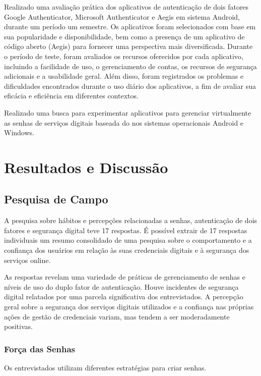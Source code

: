 \documentclass[12pt]{article}
\begin{document}
Realizado uma avaliação prática dos aplicativos de autenticação de dois
fatores Google Authenticator, Microsoft Authenticator e Aegis em sistema
Android, durante um período um semestre. Os aplicativos foram selecionados
com base em sua popularidade e disponibilidade, bem como a presença de um
aplicativo de código aberto (Aegis) para fornecer uma perspectiva mais
diversificada.
Durante o período de teste, foram avaliados os recursos oferecidos por cada
aplicativo, incluindo a facilidade de uso, o gerenciamento de contas, os
recursos de segurança adicionais e a usabilidade geral.
Além disso, foram registrados os problemas e dificuldades encontrados
durante o uso diário dos aplicativos, a fim de avaliar sua eficácia e
eficiência em diferentes contextos.

Realizado uma busca para experimentar aplicativos para gerenciar
virtualmente as senhas de serviços digitais baseada do nos sistemas
operacionais Android e Windows.

\section{Resultados e Discussão}

\subsection{Pesquisa de Campo}

A pesquisa sobre hábitos e percepções relacionadas a senhas, autenticação de dois
fatores e segurança digital teve 17 respostas.
É possível extrair de 17 respostas individuais um resumo consolidado de uma pesquisa
sobre o comportamento e a confiança dos usuários em relação às suas credenciais
digitais e à segurança dos serviços online.

As respostas revelam uma variedade de práticas de gerenciamento de senhas e níveis
de uso do duplo fator de autenticação.
Houve incidentes de segurança digital relatados por uma parcela significativa dos
entrevistados.
A percepção geral sobre a segurança dos serviços digitais utilizados e a confiança
nas próprias ações de gestão de credenciais variam, mas tendem a ser moderadamente
positivas.

\subsubsection{Força das Senhas}

Os entrevistados utilizam diferentes estratégias para criar senhas.
\end{document}
